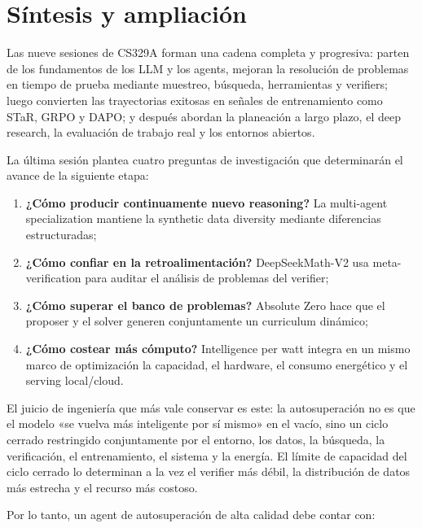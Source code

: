 \section{Síntesis y ampliación}

Las nueve sesiones de CS329A forman una cadena completa y progresiva: parten de los fundamentos de los LLM y los agents, mejoran la resolución de problemas en tiempo de prueba mediante muestreo, búsqueda, herramientas y verifiers; luego convierten las trayectorias exitosas en señales de entrenamiento como STaR, GRPO y DAPO; y después abordan la planeación a largo plazo, el deep research, la evaluación de trabajo real y los entornos abiertos.

La última sesión plantea cuatro preguntas de investigación que determinarán el avance de la siguiente etapa:

\begin{enumerate}
    \item \textbf{¿Cómo producir continuamente nuevo reasoning?} La multi-agent specialization mantiene la synthetic data diversity mediante diferencias estructuradas;
    \item \textbf{¿Cómo confiar en la retroalimentación?} DeepSeekMath-V2 usa meta-verification para auditar el análisis de problemas del verifier;
    \item \textbf{¿Cómo superar el banco de problemas?} Absolute Zero hace que el proposer y el solver generen conjuntamente un curriculum dinámico;
    \item \textbf{¿Cómo costear más cómputo?} Intelligence per watt integra en un mismo marco de optimización la capacidad, el hardware, el consumo energético y el serving local/cloud.
\end{enumerate}

El juicio de ingeniería que más vale conservar es este: la autosuperación no es que el modelo «se vuelva más inteligente por sí mismo» en el vacío, sino un ciclo cerrado restringido conjuntamente por el entorno, los datos, la búsqueda, la verificación, el entrenamiento, el sistema y la energía. El límite de capacidad del ciclo cerrado lo determinan a la vez el verifier más débil, la distribución de datos más estrecha y el recurso más costoso.

Por lo tanto, un agent de autosuperación de alta calidad debe contar con:

